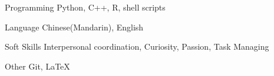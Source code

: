 

\begin{cvskills}

  \cvskill
    {Programming} %
    {Python, C++, R, shell scripts} %
    
  \cvskill
    {Language} %
    {Chinese(Mandarin), English} %
    
  \cvskill
    {Soft Skills} %
    {Interpersonal coordination, Curiosity, Passion, Task Managing} %
    
  \cvskill
    {Other} %
    {Git, \LaTeX} %

\end{cvskills}
